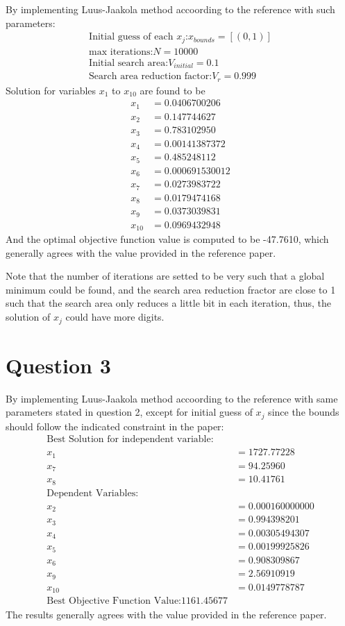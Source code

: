 \documentclass[a4paper,12pt]{article} %
\begin{document}
By implementing Luus-Jaakola method accoording to the reference with such parameters:
\begin{align*}
    \text{Initial guess of each $x_j$:} x_{bounds} = [(0, 1)]\\
    \text{max iterations:} N=10000\\
    \text{Initial search area:} V_{initial}=0.1\\
    \text{Search area reduction factor:} V_{r}=0.999
\end{align*}
Solution for variables $x_1$ to $x_{10} $ are found to be 
\begin{align*}
    x_1 &= 0.0406700206 \\
    x_2 &= 0.147744627 \\
    x_3 &= 0.783102950 \\
    x_4 &= 0.00141387372 \\
    x_5 &= 0.485248112 \\
    x_6 &= 0.000691530012 \\
    x_7 &= 0.0273983722 \\
    x_8 &= 0.0179474168 \\
    x_9 &= 0.0373039831 \\
    x_{10} &= 0.0969432948
\end{align*}
And the optimal objective function value is computed to be -47.7610, which generally agrees with the value provided
in the reference paper.

Note that the number of iterations are setted to be very such that a global minimum could be found, and the search area
reduction fractor are close to 1 such that the search area only reduces a little bit in each iteration, thus, the solution of 
$x_j$ could have more digits.

\section*{\textbf{Question 3}}

By implementing Luus-Jaakola method accoording to the reference with same parameters stated in question 2, except for initial guess of 
$x_j$ since the bounds should follow the indicated constraint in the paper:
\begin{align*}
\text{Best Solution for independent variable:} \\
x_1 &= 1727.77228\\
x_7 &= 94.25960\\
x_8 &= 10.41761\\
\text{Dependent Variables:}\\
x_2 &= 0.000160000000 \\
x_3 &=  0.994398201\\
x_4 &=  0.00305494307\\
x_5 &=  0.00199925826\\
x_6 &= 0.908309867 \\
x_9 &= 2.56910919 \\
x_{10} &= 0.0149778787 \\
\text{Best Objective Function Value:} 1161.45677
\end{align*}
The results generally agrees with the value provided in the reference paper.
\end{document}
